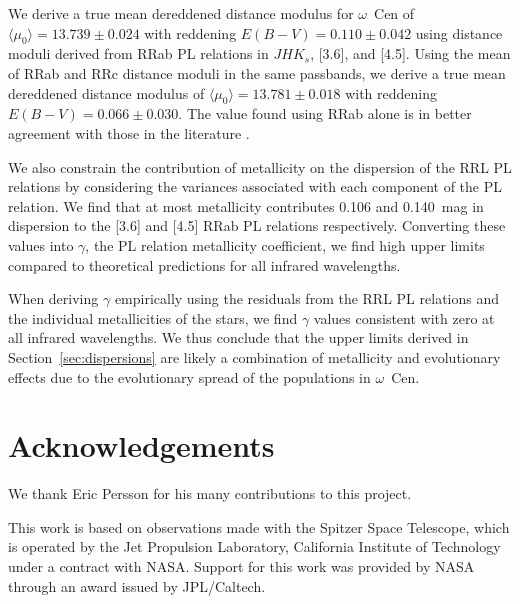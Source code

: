 \documentclass[a4paper,fleqn,usenatbib]{mnras}
\begin{document}
We derive a true mean dereddened distance modulus for $\omega$~Cen of $\langle \mu_0 \rangle = 13.739 \pm 0.024$ with reddening ${E(B-V) = 0.110 \pm 0.042}$ using distance moduli derived from RRab PL relations in $JHK_s$, [3.6], and [4.5]. Using the mean of RRab and RRc distance moduli in the same passbands, we derive a true mean dereddened distance modulus of $\langle \mu_0 \rangle = 13.781 \pm 0.018$ with reddening $E(B-V) = 0.066 \pm 0.030$. The value found using RRab alone is in better agreement with those in the literature \citep[e.g.][]{2002ASPC..265...95L, 2006ApJ...652..362D}.

We also constrain the contribution of metallicity on the dispersion of the RRL PL relations by considering the variances associated with each component of the PL relation. We find that at most metallicity contributes 0.106 and 0.140~mag in dispersion to the [3.6] and [4.5] RRab PL relations respectively. Converting these values into $\gamma$, the PL relation metallicity coefficient, we find high upper limits compared to theoretical predictions for all infrared wavelengths. 

When deriving $\gamma$ empirically using the residuals from the RRL PL relations and the individual metallicities of the stars, we find $\gamma$ values consistent with zero at all infrared wavelengths. We thus conclude that the upper limits derived in Section~\ref{sec:dispersions} are likely a combination of metallicity and evolutionary effects due to the evolutionary spread of the populations in $\omega$~Cen.  



\section*{Acknowledgements}
\label{sec:acknowledgements}

We thank Eric Persson for his many contributions to this project.

This work is based on observations made with the Spitzer Space Telescope, which is operated by the Jet Propulsion Laboratory, California Institute of Technology under a contract with NASA. Support for this work was provided by NASA through an award issued by JPL/Caltech.
\end{document}
